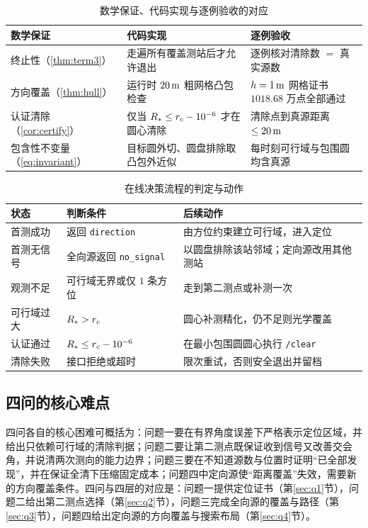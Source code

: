 \begin{table}[!htbp]
  \caption{数学保证、代码实现与逐例验收的对应}\label{tab:proof-impl}\centering\small
  \begin{tabularx}{\textwidth}{@{}L L L@{}}
    \toprule[1.5pt]
    数学保证 & 代码实现 & 逐例验收 \\
    \midrule[1pt]
    终止性（\cref{thm:term3}） & 走遍所有覆盖测站后才允许退出 & 逐例核对清除数 $=$ 真实源数 \\
    方向覆盖（\cref{thm:hull}） & 运行时 $20\,\mathrm{m}$ 粗网格凸包检查 & $h=1\,\mathrm{m}$ 网格证书 $1018.68$ 万点全部通过 \\
    认证清除（\cref{cor:certify}） & 仅当 $R_{*}\le r_c-10^{-6}$ 才在圆心清除 & 清除点到真源距离 $\le20\,\mathrm{m}$ \\
    包含性不变量（\cref{eq:invariant}） & 目标圆外切、圆盘排除取凸包外近似 & 每时刻可行域与包围圆均含真源 \\
    \bottomrule[1.5pt]
  \end{tabularx}
\end{table}

\begin{table}[!htbp]
  \caption{在线决策流程的判定与动作}\label{tab:decision}\centering\small
  \begin{tabularx}{\textwidth}{@{}l L L@{}}
    \toprule[1.5pt]
    状态 & 判断条件 & 后续动作 \\
    \midrule[1pt]
    首测成功 & 返回 \texttt{direction} & 由方位约束建立可行域，进入定位 \\
    首测无信号 & 全向源返回 \texttt{no\_signal} & 以圆盘排除该站邻域；定向源改用其他测站 \\
    观测不足 & 可行域无界或仅 $1$ 条方位 & 走到第二测点或补测一次 \\
    可行域过大 & $R_{*}>r_c$ & 圆心补测精化，仍不足则光学覆盖 \\
    认证通过 & $R_{*}\le r_c-10^{-6}$ & 在最小包围圆圆心执行 \texttt{/clear} \\
    清除失败 & 接口拒绝或超时 & 限次重试，否则安全退出并留档 \\
    \bottomrule[1.5pt]
  \end{tabularx}
\end{table}

\subsection{四问的核心难点}

四问各自的核心困难可概括为：问题一要在有界角度误差下严格表示定位区域，并给出只依赖可行域的清除判据；问题二要让第二测点既保证收到信号又改善交会角，并说清两次测向的能力边界；问题三要在不知道源数与位置时证明“已全部发现”，并在保证全清下压缩固定成本；问题四中定向源使“距离覆盖”失效，需要新的方向覆盖条件。四问与四层的对应是：问题一提供定位证书（第\ref{sec:q1}节），问题二给出第二测点选择（第\ref{sec:q2}节），问题三完成全向源的覆盖与路径（第\ref{sec:q3}节），问题四给出定向源的方向覆盖与搜索布局（第\ref{sec:q4}节）。


